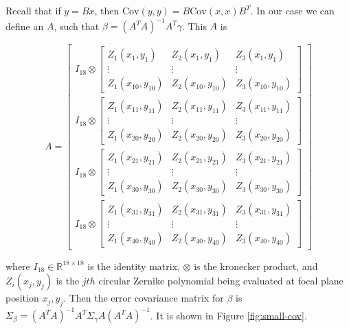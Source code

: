 Recall that if $y = Bx$, then $\text{Cov}(y,y) = B\text{Cov}(x,x)B^T$. In our case we can define an $A$, such that $\beta = (A^TA)^{-1}A^T\gamma$. This $A$ is 

\begin{equation*}
A = \begin{bmatrix}
I_{18} \otimes \begin{bmatrix}Z_1(x_1,y_1) & Z_2(x_1,y_1) & Z_3(x_1,y_1) \\ \vdots & \vdots & \vdots \\  Z_1(x_{10},y_{10}) & Z_2(x_{10},y_{10}) & Z_3(x_{10},y_{10}) \end{bmatrix}\\
I_{18} \otimes \begin{bmatrix}Z_1(x_{11},y_{11}) & Z_2(x_{11},y_{11}) & Z_3(x_{11},y_{11}) \\ \vdots & \vdots & \vdots \\  Z_1(x_{20},y_{20}) & Z_2(x_{20},y_{20}) & Z_3(x_{20},y_{20}) \end{bmatrix}\\
I_{18} \otimes \begin{bmatrix}Z_1(x_{21},y_{21}) & Z_2(x_{21},y_{21}) & Z_3(x_{21},y_{21}) \\ \vdots & \vdots & \vdots \\  Z_1(x_{30},y_{30}) & Z_2(x_{30},y_{30}) & Z_3(x_{30},y_{30}) \end{bmatrix}\\
I_{18} \otimes \begin{bmatrix}Z_1(x_{31},y_{31}) & Z_2(x_{31},y_{31}) & Z_3(x_{31},y_{31}) \\ \vdots & \vdots & \vdots \\  Z_1(x_{40},y_{40}) & Z_2(x_{40},y_{40}) & Z_3(x_{40},y_{40}) \end{bmatrix}
\end{bmatrix}
\end{equation*}

\noindent where $I_{18} \in \mathbb{R}^{18 \times 18}$ is the identity matrix, $\otimes$ is the kronecker product, and $Z_i(x_j,y_j)$ is the $jth$ circular Zernike polynomial being evaluated at focal plane position $x_j,y_j$. Then the error covariance matrix for $\beta$ is $\Sigma_{\beta} = (A^TA)^{-1}A^T\Sigma_{\gamma}A(A^TA)^{-1}$. It is shown in Figure \ref{fig:small-cov}.

